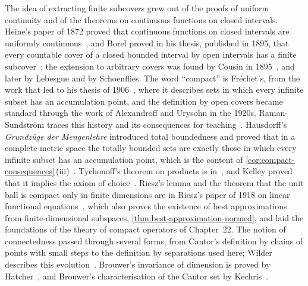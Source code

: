 The idea of extracting finite subcovers grew out of the proofs of uniform continuity and of the theorems on continuous functions on closed intervals. Heine's paper of 1872 proved that continuous functions on closed intervals are uniformly continuous~\cite{heine1872}, and Borel proved in his thesis, published in 1895, that every countable cover of a closed bounded interval by open intervals has a finite subcover~\cite{borel1895}; the extension to arbitrary covers was found by Cousin in 1895~\cite{cousin1895}, and later by Lebesgue and by Schoenflies. The word ``compact'' is Fr\'echet's, from the work that led to his thesis of 1906~\cite{frechet1906}, where it describes sets in which every infinite subset has an accumulation point, and the definition by open covers became standard through the work of Alexandroff and Urysohn in the 1920s. Raman-Sundstr\"om traces this history and its consequences for teaching~\cite{ramansundstrom2015}. Hausdorff's \emph{Grundz\"uge der Mengenlehre} introduced total boundedness and proved that in a complete metric space the totally bounded sets are exactly those in which every infinite subset has an accumulation point, which is the content of \cref{cor:compact-consequences}\,(iii)~\cite{hausdorff1914}. Tychonoff's theorem on products is in~\cite{tychonoff1930}, and Kelley proved that it implies the axiom of choice~\cite{kelley1950}. Riesz's lemma and the theorem that the unit ball is compact only in finite dimensions are in Riesz's paper of 1918 on linear functional equations~\cite{riesz1918}, which also proves the existence of best approximations from finite-dimensional subspaces, \cref{thm:best-approximation-normed}, and laid the foundations of the theory of compact operators of Chapter~22. The notion of connectedness passed through several forms, from Cantor's definition by chains of points with small steps to the definition by separations used here; Wilder describes this evolution~\cite{wilder1978}. Brouwer's invariance of dimension is proved by Hatcher~\cite{hatcher2002}, and Brouwer's characterisation of the Cantor set by Kechris~\cite{kechris1995}.

